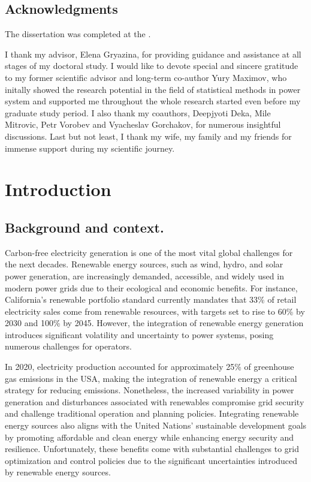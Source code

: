 \section*{Acknowledgments} 
The dissertation was completed at the {\thesisOrganizationEn}.

I thank my advisor, Elena Gryazina, for providing guidance and assistance at all stages of my doctoral study. I would like to devote special and sincere gratitude to my former scientific advisor and long-term co-author Yury Maximov, who initally showed the research potential in the field of statistical methods in power system and supported me throughout the whole research started even before my graduate study period. I also thank my coauthors, Deepjyoti Deka, Mile Mitrovic, Petr Vorobev and Vyacheslav Gorchakov, for numerous insightful discussions. Last but not least, I thank my wife, my family and my friends for immense support during my scientific journey.

\chapter{Introduction}
\label{chap:Introduction}


\section{Background and context.}
Carbon-free electricity generation is one of the most vital global challenges for the next decades. Renewable energy sources, such as wind, hydro, and solar power generation, are increasingly demanded, accessible, and widely used in modern power grids due to their ecological and economic benefits. For instance, California’s renewable portfolio standard currently mandates that 33\% of retail electricity sales come from renewable resources, with targets set to rise to 60\% by 2030 and 100\% by 2045. However, the integration of renewable energy generation introduces significant volatility and uncertainty to power systems, posing numerous challenges for operators. 

In 2020, electricity production accounted for approximately 25\% of greenhouse gas emissions in the USA, making the integration of renewable energy a critical strategy for reducing emissions. Nonetheless, the increased variability in power generation and disturbances associated with renewables compromise grid security and challenge traditional operation and planning policies. Integrating renewable energy sources also aligns with the United Nations' sustainable development goals by promoting affordable and clean energy while enhancing energy security and resilience. Unfortunately, these benefits come with substantial challenges to grid optimization and control policies due to the significant uncertainties introduced by renewable energy sources.

